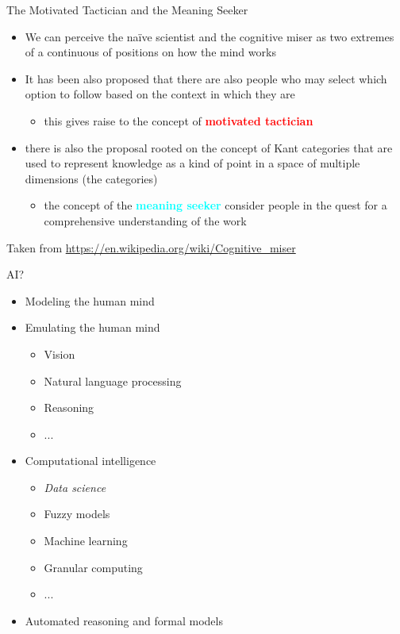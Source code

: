 \documentclass{beamer}
\begin{document}
\begin{frame}
{\centerline{The Motivated Tactician and the Meaning Seeker}}
\begin{itemize}
    \item We can perceive the na\"{i}ve scientist and the cognitive miser as two extremes of a continuous of positions on how the mind works
   \item It has been also proposed that there are also people who may select which option to follow based on the context in which they are
   \begin{itemize}
   \item this gives raise to the concept of \textcolor{red}{\bf motivated tactician}
   \end{itemize} 
   \item there is also the proposal rooted on the concept of Kant categories that are used to represent knowledge as a kind of point in a space of multiple dimensions (the categories)
   \begin{itemize}
   \item the concept of the \textcolor{cyan}{\bf meaning seeker} consider people in the quest for a comprehensive understanding of the work
\end{itemize} 
\end{itemize} 
\begin{center}
    \tiny{Taken from \url{https://en.wikipedia.org/wiki/Cognitive_miser}}
\end{center}

\end{frame}



\begin{frame}
{\centerline{AI?}}
\begin{itemize}
\item Modeling the human mind
\item Emulating the human mind
\begin{itemize}
\item Vision
\item Natural language processing
\item Reasoning
\item ...
\end{itemize} 
\item Computational intelligence
\begin{itemize}
\item \textit{Data science}
\item Fuzzy models
\item Machine learning
\item Granular computing
\item ...
\end{itemize}
\item Automated reasoning and formal models
\end{itemize} 
\end{frame}
\end{document}
